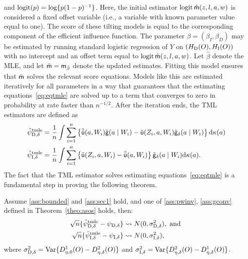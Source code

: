 and $\operatorname{logit}(p) = \log\{p(1-p)^{-1}\}$. Here, the initial estimator $\operatorname{logit}
\hat{\mathsf{m}}(z,l,a,w)$ is considered a fixed offset variable (i.e., a variable with
known parameter value equal to one). The score of these tilting models is equal
to the corresponding component of the efficient influence function. The
parameter $\beta=(\beta_I, \beta_D)$ may be estimated by running standard
logistic regression of $Y$ on $(H_{\mbox{\scriptsize D}}(O),
H_{\mbox{\scriptsize I}}(O))$ with no intercept and an offset term equal to
$\operatorname{logit} \hat{\mathsf{m}}(z,l,a,w)$. Let $\hat\beta$ denote the MLE, and let $\tilde
{\mathsf{m}}=\mathsf{m}_{\hat\beta}$ denote the updated estimates. Fitting this model ensures that
$\tilde{\mathsf{m}}$ solves the relevant score equations. Models like this are estimated
iteratively for all parameters in a way that guarantees that the estimating
equations~\eqref{eq:eqtmle} are solved up to a term that converges to zero in
probability at rate faster than $n^{-1/2}$. After the iteration ends, the TML
estimators are defined as
\begin{equation}
  \begin{split}
    \hat\psi_{\mbox{\scriptsize D}, \delta}^{\mbox{\scriptsize tmle}} &= \frac{1}{n} \int\sum_{i = 1}^n
    \left\{\tilde{\bar{\mathsf{u}}}(a,W_i)\tilde{\mathsf{g}}(a\mid W_i) -
      \tilde{\mathsf{u}}(Z_i,a,W_i)\tilde{\mathsf{g}}_\delta(a\mid W_i)\right\}\mathrm{d}\kappa(a)\\
    \hat\psi_{\mbox{\scriptsize I}, \delta}^{\mbox{\scriptsize tmle}} &= \frac{1}{n} \int\sum_{i = 1}^n
    \left\{\tilde{\mathsf{u}}(Z_i,a,W_i) -
      \tilde{\bar{\mathsf{u}}}(a,W_i)\right\}\tilde{\mathsf{g}}_\delta(a\mid
    W_i)\mathrm{d}\kappa(a).
  \end{split}\label{eq:tmle}
\end{equation}
The fact that the TML estimator solves estimating equations~\eqref{eq:eqtmle} is
a fundamental step in proving the following theorem.
\begin{theorem}
  \label{theo:astmle}
  Assume \ref{ass:bounded} and \ref{ass:sec1} hold, and one of
  \ref{ass:pwinv}, \ref{ass:gconv} defined in Theorem~\ref{theo:asos}
  holds, then:
  \begin{align*}
    \sqrt{n}\{\hat\psi_{\mbox{\scriptsize D}, \delta}^{\mbox{\scriptsize tmle}} - \psi_{\mbox{\scriptsize D}, \delta}\} &\rightsquigarrow N(0,
                                  \sigma^2_{\mbox{\scriptsize D},\delta}),
                                  \text{ and }\\
    \sqrt{n}\{\hat\psi_{\mbox{\scriptsize I}, \delta}^{\mbox{\scriptsize tmle}} - \psi_{\mbox{\scriptsize I}, \delta}\} &\rightsquigarrow N(0,
                                  \sigma^2_{\mbox{\scriptsize I},\delta}),
  \end{align*}
  where
  $\sigma^2_{\mbox{\scriptsize D},\delta} = \operatorname{Var}\{D_{\eta, 0}^1(O)
  -D_{\eta, \delta}^2(O)\}$ and $\sigma^2_{\mbox{\scriptsize I},\delta} =
    \operatorname{Var}\{D_{\eta, \delta}^2(O) - D_{\eta, \delta}^1(O)\}$.
\end{theorem}
